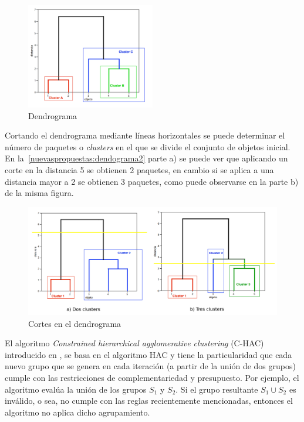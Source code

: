 \begin{figure}[H]
  \centering
    \includegraphics[width=0.5\textwidth]{img/dendograma01.png}
  \caption{Dendrograma}
  \label{nuevaspropuestas:dendograma1}
\end{figure}

Cortando el dendrograma mediante líneas horizontales se puede determinar el número de paquetes o \emph{clusters} en el que se divide el conjunto de objetos inicial. En la~\autoref{nuevaspropuestas:dendograma2} parte a) se puede ver que aplicando un corte en la distancia 5 se obtienen 2 paquetes, en cambio si se aplica a una distancia mayor a 2 se obtienen 3 paquetes, como puede observarse en la parte b) de la misma figura.

\begin{figure}[H]
  \centering
    \includegraphics[width=1\textwidth]{img/dendograma02.png}
  \caption{Cortes en el dendrograma}
  \label{nuevaspropuestas:dendograma2}
\end{figure}

El algoritmo \textit{Constrained hierarchical agglomerative clustering} (C-HAC) introducido en \cite{journals/tkde/Amer-YahiaBCFMZ14}, se basa en el algoritmo HAC y tiene la particularidad que cada nuevo grupo que se genera en cada iteración (a partir de la unión de dos grupos) cumple con las restricciones de complementariedad y presupuesto. Por ejemplo, el algoritmo evalúa la unión de los grupos $S_1$ y $S_2$. Si el grupo resultante $S_1 \cup S_2$ es inválido, o sea, no cumple con las reglas recientemente mencionadas, entonces el algoritmo no aplica dicho agrupamiento.

